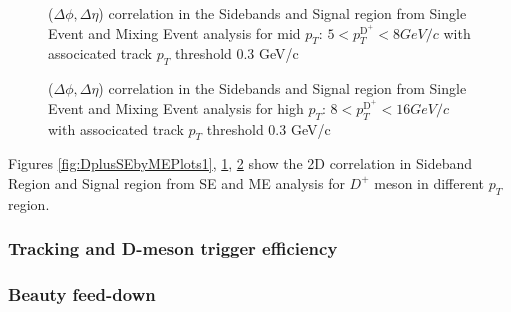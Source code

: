 \begin{figure}[!ht]
\centering
 \caption{($\Delta \phi , \Delta \eta$) correlation in the Sidebands and Signal region from Single Event and Mixing Event analysis for mid $p_{T}$: $5< p_{T}^{\text{D}^+}< 8 GeV/c$ with associcated track $p_{T}$ threshold 0.3 GeV/c }
\label{fig:DplusSEbyMEPlots2}
\end{figure}

\begin{figure}[!ht]
\centering
 \caption{($\Delta \phi , \Delta \eta$) correlation in the Sidebands and Signal region from Single Event and Mixing Event analysis for high $p_{T}$: $8< p_{T}^{\text{D}^+}< 16 GeV/c$ with associcated track $p_{T}$ threshold 0.3 GeV/c }
\label{fig:DplusSEbyMEPlots3}
\end{figure}

Figures \ref{fig:DplusSEbyMEPlots1}, \ref{fig:DplusSEbyMEPlots2}, \ref{fig:DplusSEbyMEPlots3} show the 2D correlation in Sideband Region and Signal region from SE and ME analysis for $D^+$ meson in different $p_{T}$ region.



\newpage
\subsubsection{Tracking and D-meson trigger efficiency}



\subsubsection{Beauty feed-down}

